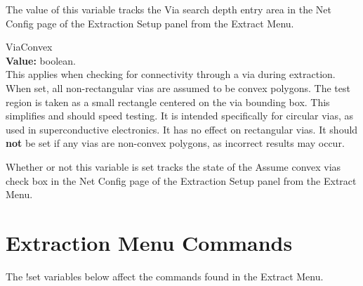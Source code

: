 \begin{description}
The value of this variable tracks the {\cb Via search depth} entry
area in the {\cb Net Config} page of the {\cb Extraction Setup} panel
from the {\cb Extract Menu}.

\item{\et ViaConvex}\\
{\bf Value:} boolean.\\
This applies when checking for connectivity through a via during
extraction.  When set, all non-rectangular vias are assumed to be
convex polygons.  The test region is taken as a small rectangle
centered on the via bounding box.  This simplifies and should speed
testing.  It is intended specifically for circular vias, as used in
superconductive electronics.  It has no effect on rectangular vias. 
It should {\bf not} be set if any vias are non-convex polygons, as
incorrect results may occur.

Whether or not this variable is set tracks the state of the {\cb
Assume convex vias} check box in the {\cb Net Config} page of the {\cb
Extraction Setup} panel from the {\cb Extract Menu}. 
\end{description}


\section{Extraction Menu Commands}

The {\cb !set} variables below affect the commands found in the
{\cb Extract Menu}.

